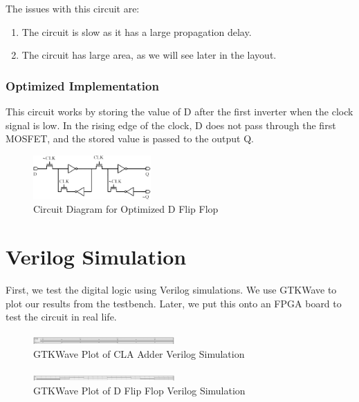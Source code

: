 \documentclass[conference]{IEEEtran}
\begin{document}
The issues with this circuit are:
\begin{enumerate}
    \item The circuit is slow as it has a large propagation delay.
    \item The circuit has large area, as we will see later in the layout.
\end{enumerate}

\subsubsection{Optimized Implementation}

This circuit works by storing the value of D after the first inverter when the clock signal is low. In the rising edge of the clock, D does not pass through the first MOSFET, and the stored value is passed to the output Q.

\begin{figure}[H]
    \centering
    \includegraphics[width=0.4\textwidth]{images/d_ff_circuit_diagram.png}
    \caption{Circuit Diagram for Optimized D Flip Flop}
\end{figure}



\section{Verilog Simulation}

First, we test the digital logic using Verilog simulations. We use GTKWave to plot our results from the testbench. Later, we put this onto an FPGA board to test the circuit in real life.

\begin{figure}[hb]
    \centering
    \includegraphics[width=0.48\textwidth]{images/verilog_cla.png}
    \caption{GTKWave Plot of CLA Adder Verilog Simulation}
\end{figure}

\begin{figure}[hb]
    \centering
    \includegraphics[width=0.48\textwidth]{images/verilog_d_ff.png}
    \caption{GTKWave Plot of  D Flip Flop Verilog Simulation}
\end{figure}
\end{document}
